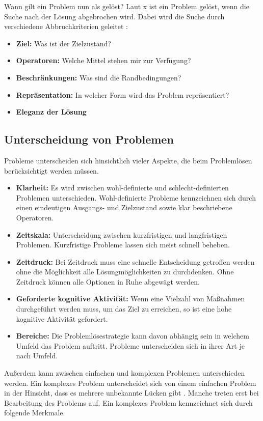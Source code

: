 Wann gilt ein Problem nun als gelöst? Laut x ist ein Problem gelöst, wenn die Suche nach der Lösung abgebrochen wird. Dabei wird die Suche durch verschiedene Abbruchkriterien geleitet \cite{Funke2015}:
\begin{itemize}
\item \textbf{Ziel:} Was ist der Zielzustand?
\item \textbf{Operatoren:} Welche Mittel stehen mir zur Verfügung?
\item \textbf{Beschränkungen:} Was sind die Randbedingungen?
\item \textbf{Repräsentation:} In welcher Form wird das Problem repräsentiert?
\item \textbf{Eleganz der Lösung} 
\end{itemize}

\subsection{Unterscheidung von Problemen}
Probleme unterscheiden sich hinsichtlich vieler Aspekte, die beim Problemlösen berücksichtigt werden müssen. \cite{Betsch2011}
\begin{itemize}
\item \textbf{Klarheit:} Es wird zwischen wohl-definierte und schlecht-definierten Problemen unterschieden. Wohl-definierte Probleme kennzeichnen sich durch einen eindeutigen Ausgangs- und Zielzustand sowie klar beschriebene Operatoren.
\item \textbf{Zeitskala:} Unterscheidung zwischen kurzfristigen und langfristigen Problemen. Kurzfristige Probleme lassen sich meist schnell beheben.
\item \textbf{Zeitdruck:} Bei Zeitdruck muss eine schnelle Entscheidung getroffen werden ohne die Möglichkeit alle Lösungmöglichkeiten zu durchdenken. Ohne Zeitdruck können alle Optionen in Ruhe abgewägt werden.
\item \textbf{Geforderte kognitive Aktivität:} Wenn eine Vielzahl von Maßnahmen durchgeführt werden muss, um das Ziel zu erreichen, so ist eine hohe kognitive Aktivität gefordert.
\item \textbf{Bereiche:} Die Problemlösestrategie kann davon abhängig sein in welchem Umfeld das Problem auftritt. Probleme unterscheiden sich in ihrer Art je nach Umfeld.
\end{itemize}
Außerdem kann zwischen einfachen und komplexen Problemen unterschieden werden. Ein komplexes Problem unterscheidet sich von einem einfachen Problem in der Hinsicht, dass es mehrere unbekannte Lücken  gibt \cite{Betsch2011}. Manche treten erst bei Bearbeitung des Problems auf. Ein komplexes Problem kennzeichnet sich durch folgende Merkmale. \cite{Funke2015}
